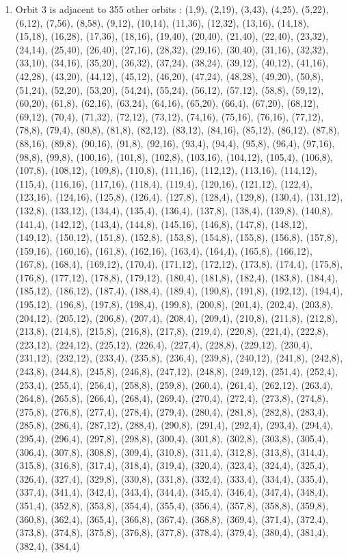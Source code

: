 \documentclass[12pt]{article}
\begin{document}
\begin{enumerate}
\item Orbit 3 is adjacent to 355 other orbits : (1,9), (2,19), (3,43), (4,25), (5,22), (6,12), (7,56), (8,58), (9,12), (10,14), (11,36), (12,32), (13,16), (14,18), (15,18), (16,28), (17,36), (18,16), (19,40), (20,40), (21,40), (22,40), (23,32), (24,14), (25,40), (26,40), (27,16), (28,32), (29,16), (30,40), (31,16), (32,32), (33,10), (34,16), (35,20), (36,32), (37,24), (38,24), (39,12), (40,12), (41,16), (42,28), (43,20), (44,12), (45,12), (46,20), (47,24), (48,28), (49,20), (50,8), (51,24), (52,20), (53,20), (54,24), (55,24), (56,12), (57,12), (58,8), (59,12), (60,20), (61,8), (62,16), (63,24), (64,16), (65,20), (66,4), (67,20), (68,12), (69,12), (70,4), (71,32), (72,12), (73,12), (74,16), (75,16), (76,16), (77,12), (78,8), (79,4), (80,8), (81,8), (82,12), (83,12), (84,16), (85,12), (86,12), (87,8), (88,16), (89,8), (90,16), (91,8), (92,16), (93,4), (94,4), (95,8), (96,4), (97,16), (98,8), (99,8), (100,16), (101,8), (102,8), (103,16), (104,12), (105,4), (106,8), (107,8), (108,12), (109,8), (110,8), (111,16), (112,12), (113,16), (114,12), (115,4), (116,16), (117,16), (118,4), (119,4), (120,16), (121,12), (122,4), (123,16), (124,16), (125,8), (126,4), (127,8), (128,4), (129,8), (130,4), (131,12), (132,8), (133,12), (134,4), (135,4), (136,4), (137,8), (138,4), (139,8), (140,8), (141,4), (142,12), (143,4), (144,8), (145,16), (146,8), (147,8), (148,12), (149,12), (150,12), (151,8), (152,8), (153,8), (154,8), (155,8), (156,8), (157,8), (159,16), (160,16), (161,8), (162,16), (163,4), (164,4), (165,8), (166,12), (167,8), (168,4), (169,12), (170,4), (171,12), (172,12), (173,8), (174,4), (175,8), (176,8), (177,12), (178,8), (179,12), (180,4), (181,8), (182,4), (183,8), (184,4), (185,12), (186,12), (187,4), (188,4), (189,4), (190,8), (191,8), (192,12), (194,4), (195,12), (196,8), (197,8), (198,4), (199,8), (200,8), (201,4), (202,4), (203,8), (204,12), (205,12), (206,8), (207,4), (208,4), (209,4), (210,8), (211,8), (212,8), (213,8), (214,8), (215,8), (216,8), (217,8), (219,4), (220,8), (221,4), (222,8), (223,12), (224,12), (225,12), (226,4), (227,4), (228,8), (229,12), (230,4), (231,12), (232,12), (233,4), (235,8), (236,4), (239,8), (240,12), (241,8), (242,8), (243,8), (244,8), (245,8), (246,8), (247,12), (248,8), (249,12), (251,4), (252,4), (253,4), (255,4), (256,4), (258,8), (259,8), (260,4), (261,4), (262,12), (263,4), (264,8), (265,8), (266,4), (268,4), (269,4), (270,4), (272,4), (273,8), (274,8), (275,8), (276,8), (277,4), (278,4), (279,4), (280,4), (281,8), (282,8), (283,4), (285,8), (286,4), (287,12), (288,4), (290,8), (291,4), (292,4), (293,4), (294,4), (295,4), (296,4), (297,8), (298,8), (300,4), (301,8), (302,8), (303,8), (305,4), (306,4), (307,8), (308,8), (309,4), (310,8), (311,4), (312,8), (313,8), (314,4), (315,8), (316,8), (317,4), (318,4), (319,4), (320,4), (323,4), (324,4), (325,4), (326,4), (327,4), (329,8), (330,8), (331,8), (332,4), (333,4), (334,4), (335,4), (337,4), (341,4), (342,4), (343,4), (344,4), (345,4), (346,4), (347,4), (348,4), (351,4), (352,8), (353,8), (354,4), (355,4), (356,4), (357,8), (358,8), (359,8), (360,8), (362,4), (365,4), (366,8), (367,4), (368,8), (369,4), (371,4), (372,4), (373,8), (374,8), (375,8), (376,8), (377,8), (378,4), (379,4), (380,4), (381,4), (382,4), (384,4)

\end{enumerate}
\end{document}
